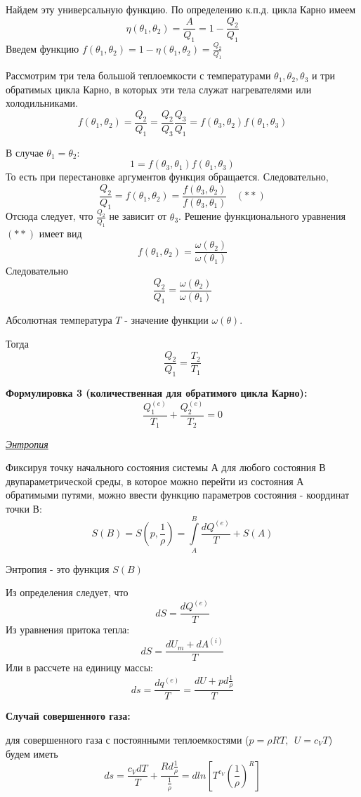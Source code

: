 Найдем эту универсальную функцию.  По определению к.п.д. цикла Карно имеем
$$ \eta(\theta_1, \theta_2) = \frac{A}{Q_1} = 1 - \frac{Q_2}{Q_1} $$
Введем функцию $f(\theta_1, \theta_2) = 1 - \eta(\theta_1, \theta_2) = \frac{Q_2}{Q_1}$

Рассмотрим три тела большой теплоемкости с температурами $\theta_1, \theta_2, \theta_3$ и три обратимых цикла Карно, в которых эти тела служат нагревателями или холодильниками.
$$ f(\theta_1, \theta_2) = \frac{Q_2}{Q_1} = \frac{Q_2}{Q_3}\frac{Q_3}{Q_1} = f(\theta_3, \theta_2)f(\theta_1, \theta_3) $$

В случае $\theta_1 = \theta_2$:
$$ 1 = f(\theta_3, \theta_1)f(\theta_1, \theta_3) $$
То есть при перестановке аргументов функция обращается. Следовательно, 
$$ \frac{Q_2}{Q_1} = f(\theta_1, \theta_2) = \frac{f(\theta_3, \theta_2)}{f(\theta_3, \theta_1)} \ \ \ \ (**)$$
Отсюда следует, что $\frac{Q_2}{Q_1}$ не зависит от $\theta_3$.  Решение функционального уравнения $(**)$ имеет вид
$$ f(\theta_1, \theta_2) = \frac{\omega(\theta_2)}{\omega(\theta_1)} $$
Следовательно $$ \frac{Q_2}{Q_1} = \frac{\omega(\theta_2)}{\omega(\theta_1)} $$

\begin{defn}
	Абсолютная температура $T$ - значение функции $\omega(\theta)$.
\end{defn}

Тогда $$ \frac{Q_2}{Q_1} = \frac{T_2}{T_1} $$

\textbf{Формулировка 3 (количественная для обратимого цикла Карно):} 
$$ \frac{Q_1^{(e)}}{T_1} + \frac{Q_2^{(e)}}{T_2} = 0 $$


\begin{center}
	\textit{\underline{Энтропия}}
\end{center}

Фиксируя точку начального состояния системы А для любого состояния В двупараметрической среды, в которое можно перейти из состояния А обратимыми путями, можно ввести функцию параметров состояния - координат точки В:
$$ S(B) = S\left(p, \frac{1}{\rho}\right) = \int\limits_{A}^{B}\frac{dQ^{(e)}}{T} + S(A) $$

\begin{defn}
	 Энтропия - это функция $S(B)$
\end{defn}

Из определения следует, что $$ dS = \frac{dQ^{(e)}}{T} $$
Из уравнения притока тепла:
$$ dS = \frac{dU_m + dA^{(i)}}{T} $$
Или в рассчете на единицу массы:
$$ ds = \frac{dq^{(e)}}{T} = \frac{dU + pd\frac{1}{\rho}}{T} $$

\textbf{Случай совершенного газа:}

для совершенного газа с постоянными теплоемкостями ($p = \rho R T, \ \ U = c_V T$) будем иметь
$$ ds = \frac{c_VdT}{T} + \frac{Rd\frac{1}{\rho}}{\frac{1}{\rho}} = dln\left[T^{c_V}\left( \frac{1}{\rho} \right)^{R}\right] $$


